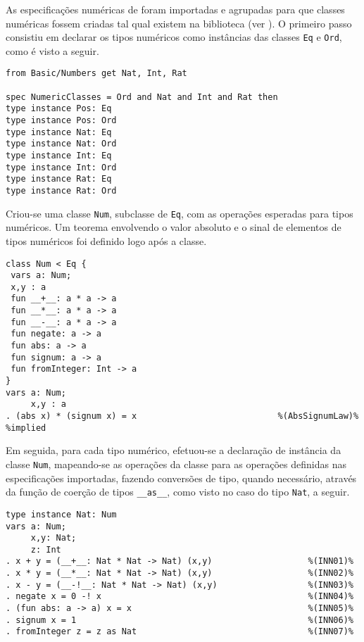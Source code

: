 As especificações numéricas de \CASL foram importadas e agrupadas para que classes numéricas fossem criadas tal qual existem na biblioteca \Prelude (ver ).
O primeiro passo consistiu em declarar os tipos numéricos como instâncias das classes \Verb.Eq. e \Verb.Ord., como é visto a seguir.

\begin{Verbatim}
from Basic/Numbers get Nat, Int, Rat

spec NumericClasses = Ord and Nat and Int and Rat then
type instance Pos: Eq
type instance Pos: Ord
type instance Nat: Eq
type instance Nat: Ord
type instance Int: Eq
type instance Int: Ord
type instance Rat: Eq
type instance Rat: Ord
\end{Verbatim}

Criou-se uma classe \Verb.Num., subclasse de \Verb.Eq., com as operações esperadas para tipos numéricos.
Um teorema envolvendo o valor absoluto e o sinal de elementos de tipos numéricos foi definido logo após a classe.

\begin{Verbatim}
class Num < Eq {
 vars a: Num;
 x,y : a
 fun __+__: a * a -> a
 fun __*__: a * a -> a
 fun __-__: a * a -> a
 fun negate: a -> a
 fun abs: a -> a
 fun signum: a -> a
 fun fromInteger: Int -> a
}
vars a: Num;
     x,y : a
. (abs x) * (signum x) = x                            %(AbsSignumLaw)% %implied
\end{Verbatim}

Em seguida, para cada tipo numérico, efetuou-se a declaração de instância da classe \Verb.Num., mapeando-se as operações da classe para as operações definidas nas especificações importadas, fazendo conversões de tipo, quando necessário, através da função de coerção de tipos \Verb.__as__., como visto no caso do tipo \Verb.Nat., a seguir.
\begin{Verbatim}
type instance Nat: Num                                     
vars a: Num;                                               
     x,y: Nat;                                             
     z: Int                                                
. x + y = (__+__: Nat * Nat -> Nat) (x,y)                   %(INN01)%
. x * y = (__*__: Nat * Nat -> Nat) (x,y)                   %(INN02)%
. x - y = (__-!__: Nat * Nat -> Nat) (x,y)                  %(INN03)%
. negate x = 0 -! x                                         %(INN04)%
. (fun abs: a -> a) x = x                                   %(INN05)%
. signum x = 1                                              %(INN06)%
. fromInteger z = z as Nat                                  %(INN07)%
\end{Verbatim}

